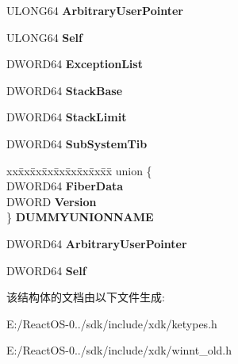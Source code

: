 \begin{DoxyCompactItemize}
\begin{tabbing}
\end{tabbing}\item 
\mbox{\label{struct___n_t___t_i_b64_a6cc1aa29bce5150cdea309f775d4771b}} 
U\+L\+O\+N\+G64 {\bfseries Arbitrary\+User\+Pointer}
\item 
\mbox{\label{struct___n_t___t_i_b64_a8fd7b945a32ec22f7adbec41ad2b4153}} 
U\+L\+O\+N\+G64 {\bfseries Self}
\item 
\mbox{\label{struct___n_t___t_i_b64_a276cd225437c93466a03fe2ba2b5c2ab}} 
D\+W\+O\+R\+D64 {\bfseries Exception\+List}
\item 
\mbox{\label{struct___n_t___t_i_b64_a8d0b7b19d92d97f38d5c1bda54ac68f0}} 
D\+W\+O\+R\+D64 {\bfseries Stack\+Base}
\item 
\mbox{\label{struct___n_t___t_i_b64_afc2c0146ff701e5cdf4211aa0c29035d}} 
D\+W\+O\+R\+D64 {\bfseries Stack\+Limit}
\item 
\mbox{\label{struct___n_t___t_i_b64_a202d1ce34893ca22b1525b018cd074a8}} 
D\+W\+O\+R\+D64 {\bfseries Sub\+System\+Tib}
\item 
\mbox{\label{struct___n_t___t_i_b64_a890a779ddefa236fc417b4f4f49d203c}} 
\begin{tabbing}
xx\=xx\=xx\=xx\=xx\=xx\=xx\=xx\=xx\=\kill
union \{\\
\>DWORD64 {\bfseries FiberData}\\
\>DWORD {\bfseries Version}\\
\} {\bfseries DUMMYUNIONNAME}\\

\end{tabbing}\item 
\mbox{\label{struct___n_t___t_i_b64_aeb142a6fe6e73557a91047701ff4932d}} 
D\+W\+O\+R\+D64 {\bfseries Arbitrary\+User\+Pointer}
\item 
\mbox{\label{struct___n_t___t_i_b64_acdfef5449f3d9fe6ffb8540e2ebbac83}} 
D\+W\+O\+R\+D64 {\bfseries Self}
\end{DoxyCompactItemize}


该结构体的文档由以下文件生成\+:\begin{DoxyCompactItemize}
\item 
E\+:/\+React\+O\+S-\/0../sdk/include/xdk/ketypes.\+h\item 
E\+:/\+React\+O\+S-\/0../sdk/include/xdk/winnt\+\_\+old.\+h\end{DoxyCompactItemize}
